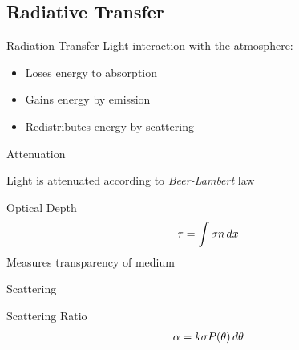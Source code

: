 \documentclass[compress,red,12pt]{beamer}
\begin{document}
\subsection{Radiative Transfer}

\begin{frame}{Radiation Transfer}
  Light interaction with the atmosphere:
  \begin{itemize}
  \item Loses energy to absorption
  \item Gains energy by emission
  \item Redistributes energy by scattering
  \end{itemize}
\end{frame}


% 
\begin{frame}{Attenuation}
  \begin{block}{Light is attenuated according to {\em Beer-Lambert} law}
    \centerline{\def\svgwidth{0.6\columnwidth}\small{}}
  \end{block}
  {
    \begin{block}{Optical Depth}    
      \begin{align*}
        \tau = \int \sigma n \,d{x}
      \end{align*}
      Measures transparency of medium
    \end{block}
  }
\end{frame}


%
%
\begin{frame}{Scattering}
    \begin{overprint}
      {
        \centerline{\def\svgwidth{0.6\linewidth}\small{}}
      }
      {
        \centerline{\def\svgwidth{0.6\linewidth}\small{}}
      }
      {
        \centerline{\def\svgwidth{0.6\linewidth}\small{}}
      }
    \end{overprint}
    {
      \begin{center}{Scattering Ratio}
        \begin{align*}
          \alpha = k \sigma P(\theta) \,d{\theta}
        \end{align*}
      \end{center}
    }
\end{frame}
\end{document}

